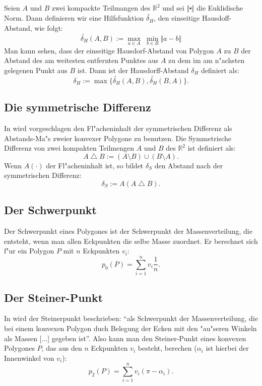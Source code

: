\subsection{}

Seien $A$ und $B$ zwei kompackte Teilmangen des $\mathbb{R}^2$ und sei $\Vert\centerdot\Vert$ die Euklidische Norm.
Dann definieren wir eine Hilfsfunktion $ \widetilde{\delta_H}  $, den einseitige Hausdoff-Abstand, wie folgt:
\[ \widetilde{\delta_H}(A,B):=\max_{a\in A} \;\min_{b\in B} \Vert a-b \Vert\]
Man kann sehen, dass der einseitige Hausdorf-Abstand von Polygon $A$ zu $B$ der Abstand des am weitesten entfernten Punktes aus $A$ zu dem im am n"achsten gelegenen Punkt aus $B$ ist. Dann ist der Hausdorff-Abstand $\delta_H$ definiert als:
\[\delta_H:=\max\{\widetilde{\delta_H}(A,B),\widetilde{\delta_H}(B,A)\}.\]


\subsection{Die symmetrische Differenz}

In \cite{AFRW} wird vorgeschlagen den Fl"acheninhalt der symmetrischen Differenz als Abstands-Ma"s zweier konvexer Polygone zu benutzen. Die Symmetrische Differenz von zwei kompakten Teilmengen $A$ und $B$ des $\mathbb{R}^2 $ ist definiert als:
\[A\bigtriangleup B:=(A\setminus B)\cup(B\setminus A).\]
Wenn $A(\cdot)$ der Fl"acheninhalt ist, so bildet $\delta_S$ den Abstand nach der symmetrischen Differenz:
\[\delta_S:=A(A \bigtriangleup B).\]

\subsection{Der Schwerpunkt}

Der Schwerpunkt eines Polygones ist der Schwerpunkt der Massenverteilung, die entsteht, wenn man allen Eckpunkten die selbe Masse zuordnet. Er berechnet sich f"ur ein Polygon $P$ mit $n$ Eckpunkten $v_i$:
\[p_0(P)=\sum^n_{i=1}v_i \frac{1}{n}.\]

\subsection{Der Steiner-Punkt}

In \cite{Sch} wird der Steinerpunkt beschrieben: "`als Schwerpunkt der Massenverteilung, die bei einem konvexen Polygon duch Belegung der Ecken mit den "au"seren Winkeln als Massen [...] gegeben ist"'. Also kann man den Steiner-Punkt eines konvexen Polygones $P$, das aus den $n$ Eckpunkten $v_i$ besteht, berechen ($\alpha_i$ ist hierbei der Innenwinkel von $v_i$):
\[p_2(P)=\sum^n_{i=1}v_i (\pi-\alpha_i).\]

